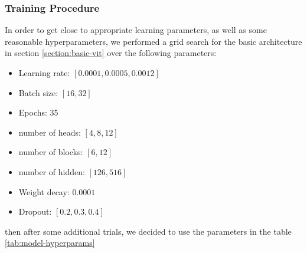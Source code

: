 \documentclass[twocolumn,superscriptaddress,aps]{revtex4-1}
\begin{document}
\begin{table}[ht]
  \centering
  \caption{Parameters used for each model.}
  \label{tab:model-hyperparams}
  \scriptsize
\end{table}
\subsubsection{Training Procedure}
In order to get close to appropriate learning parameters, as well as some reasonable hyperparameters, we performed a grid search for the basic architecture in section \ref{section:basic-vit} over the following parameters:
\begin{itemize}
	\item Learning rate: $[0.0001, 0.0005, 0.0012]$
	\item Batch size: $[16, 32]$
	\item Epochs: 35
	\item number of heads: $[4, 8, 12]$
	\item number of blocks: $[6, 12]$
	\item number of hidden: $[126, 516]$
	\item Weight decay: $0.0001$
	\item Dropout: $[0.2, 0.3, 0.4]$
\end{itemize}
then after some additional trials, we decided to use the parameters in the table \ref{tab:model-hyperparams}
\end{document}
